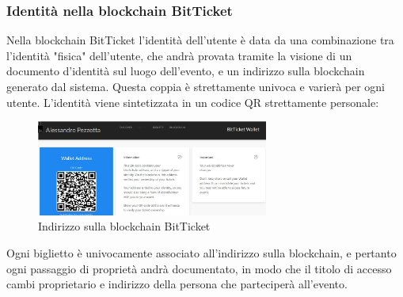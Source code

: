 \subsubsection{Identità nella blockchain BitTicket} \label{bitt}
 Nella blockchain BitTicket l'identità dell'utente è data da una combinazione tra l'identità "fisica" dell'utente, che andrà provata tramite la visione di un documento d'identità sul luogo dell'evento, e un indirizzo sulla blockchain generato dal sistema. Questa coppia è strettamente univoca e varierà per ogni utente. L'identità viene sintetizzata in un codice QR strettamente personale:
\begin{figure}[H]
	\centering
	\includegraphics[width=0.68\textwidth]{chapter3/immagini/bitticket_bc}
	\caption{Indirizzo sulla blockchain BitTicket}
	\label{blockchain}
\end{figure}
Ogni biglietto è univocamente associato all'indirizzo sulla blockchain, e pertanto ogni passaggio di proprietà andrà documentato, in modo che il titolo di accesso cambi proprietario e indirizzo della persona che parteciperà all'evento. 
